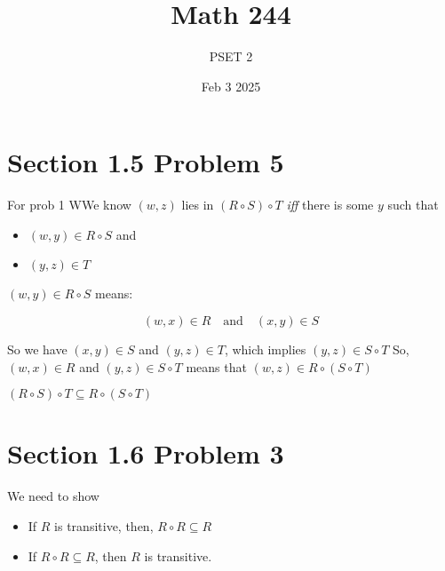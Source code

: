 \documentclass{report}
\title{\Huge{Math 244}}
\author{\huge{PSET 2}}
\date{Feb 3 2025}
\begin{document}
\maketitle
\newpage%
\tableofcontents
\pagebreak

\section*{Section 1.5 Problem 5}


\begin{RemarkWithLily}{For prob 1}
  WWe know $(w,z)$ lies in $(R \circ S) \circ T$ \textit{iff} there is some $y$ such that 
  \begin{itemize}
    \item [1] $(w,y) \in R \circ S $ and 
    \item [2] $(y,z) \in T$ 
  \end{itemize}

  $(w, y) \in R \circ S$ means: 

  \[ (w,x) \in R \quad \text{and} \quad (x,y) \in S\]
  
  So we have $(x,y) \in S$ and $(y,z) \in T $, which implies $(y, z) \in S \circ T$ So, $(w,x) \in R$ and 
  $(y,z) \in S \circ T$ means that $(w,z) \in R \circ (S \circ T)$ 

  $(R \circ S) \circ T \subseteq R \circ (S \circ T)$ 



\end{RemarkWithLily}

\section*{Section 1.6 Problem 3}


\begin{keyideaWithLotus}
  We need to show 
  \begin{itemize}
    \item [$\Rightarrow$] If $R$ is transitive, then, $R \circ R \subseteq R$
    \item [$\Leftarrow$] If $R \circ R \subseteq R$, then $R$ is transitive.   
  \end{itemize}

\end{keyideaWithLotus}
\end{document}
